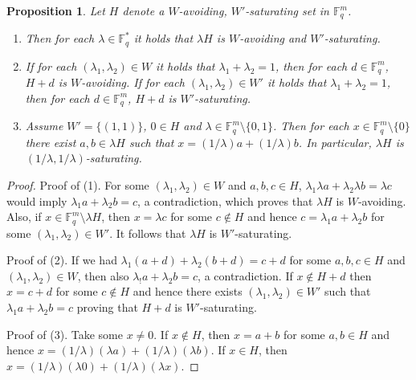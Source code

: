\documentclass[11pt]{article}
\numberwithin{table}{section}
\newcommand{\F}{{\mathbb F}}
\newtheorem{proposition}[theorem]{Proposition}
\theoremstyle{definition}
\begin{document}
	
	\begin{proposition} 
		\label{mirejo}
		Let $H$ denote a $W$-avoiding, $W'$-saturating set in $\F_q^m$.
		\begin{enumerate}[\rm(1)]
			\item Then for each $\lambda \in \F_q^*$ it holds that $\lambda H$ is $W$-avoiding and $W'$-saturating.
			\item If for each $(\lambda_1,\lambda_2) \in W$ it holds that $\lambda_1+\lambda_2=1$, then for each $d\in \F_q^m$, $H + d$ is $W$-avoiding. If for each $(\lambda_1,\lambda_2) \in W'$ it holds that $\lambda_1+\lambda_2=1$, then for each $d\in \F_q^m$, $H + d$ is $W'$-saturating.
			\item Assume $W'=\{(1,1)\}$, $0 \in H$ and $\lambda \in \F_{q}^m \setminus \{0,1\}$. Then for each $x\in \F_q^m \setminus \{0\}$ there exist $a,b \in \lambda H$ such that $x=(1/\lambda) a + (1/\lambda) b$. In particular, $\lambda H$ is $(1/\lambda,1/\lambda)$-saturating.
		\end{enumerate}
	\end{proposition}
	\begin{proof}
		Proof of (1). For some $(\lambda_1,\lambda_2)\in W$ and $a,b,c \in H$, $\lambda_1 \lambda a + \lambda_2 \lambda b = \lambda c $ would imply $\lambda_1 a + \lambda_2 b = c$, a contradiction, which proves that $\lambda H$ is $W$-avoiding. Also, if $x\in \F_q^m \setminus \lambda H$, then $x=\lambda c$ for some $c \notin H$ and hence $c=\lambda_1 a + \lambda_2 b$ for some $(\lambda_1,\lambda_2) \in W'$. It follows that $\lambda H$ is $W'$-saturating.
		
		Proof of (2). If we had $\lambda_1(a+d)+\lambda_2(b+d)=c+d$ for some $a,b,c \in H$ and $(\lambda_1,\lambda_2)\in W$, then also $\lambda_! a+\lambda_2 b=c$, a contradiction. If $x \notin H+d$ then $x=c+d$ for some $c\notin H$ and hence there exists $(\lambda_1,\lambda_2)\in W'$ such that $\lambda_1 a + \lambda_2 b = c$ proving that $H+d$ is $W'$-saturating.
		
		Proof of (3). Take some $x\neq 0$.
		If $x \notin H$, then $x=a+b$ for some $a,b \in H$ and hence $x=(1/\lambda) (\lambda a)+(1/\lambda) (\lambda b)$. If $x \in H$, then $x=(1/\lambda) (\lambda 0)+(1/\lambda) (\lambda x)$. 
	\end{proof}
	
	
	
	
\end{document}
